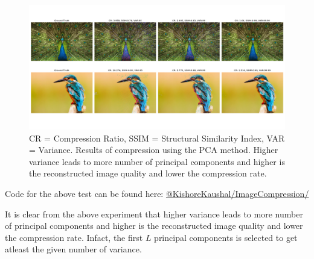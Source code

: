 \begin{figure}[!ht]
    \centering
    \includegraphics[width=1\textwidth]{fig/2-4.png}
    \caption{ CR = Compression Ratio, SSIM = Structural Similarity Index, VAR = Variance. Results of compression using the PCA method. Higher variance leads to more number of principal components and higher is the reconstructed image quality and lower the compression rate.}
    \label{fig:imageCompressionUsingPCA}
\end{figure}

Code for the above test can be found here: \href{https://github.com/KishoreKaushal/ImageCompression/tree/master/PCA}{@KishoreKaushal/ImageCompression/}

It is clear from the above experiment that higher variance leads to more number of principal components and higher is the reconstructed image quality and lower the compression rate. Infact, the first $L$ principal components is selected to get atleast the given number of variance.